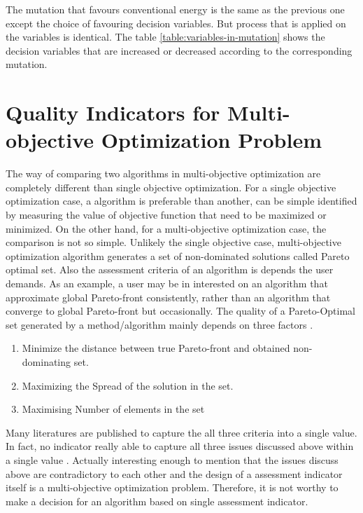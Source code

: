 \documentclass{article}
\begin{document}
The mutation that favours conventional energy is the same as the previous one except the choice of favouring decision variables. 
But process that is applied on the variables is identical.
The table \ref{table:variables-in-mutation} shows the decision variables that are increased or decreased according to the corresponding mutation.

\section{Quality Indicators for Multi-objective Optimization Problem}
\label{sec:Quality Indicators for Multi-objective Optimization Problem}
The way of comparing two algorithms in multi-objective optimization are completely different than single objective optimization. 
For a single objective optimization case, a algorithm is preferable than another, can be simple identified by measuring the value of objective function that need to be maximized or minimized. 
On the other hand, for a multi-objective optimization case, the comparison is not so simple. 
Unlikely the single objective case, multi-objective optimization algorithm generates a set of non-dominated solutions called Pareto optimal set. 
Also the assessment criteria of an algorithm is depends the user demands.
As an example, a user may be in interested on an algorithm that approximate global Pareto-front consistently, rather than an algorithm that converge to global Pareto-front but occasionally.
The quality of a Pareto-Optimal set generated by a method/algorithm mainly depends on three factors \cite{sarker_assessment_2002}.
\begin{enumerate}
\item Minimize the distance between true Pareto-front and obtained non-dominating set.
\item Maximizing the Spread of the solution in the set.
\item Maximising Number of elements in the set
\end{enumerate}

Many literatures are published to capture the all three criteria into a single value. 
In fact, no indicator really able to capture all three issues discussed above within a single value \cite{sarker_assessment_2002}.
Actually interesting enough to mention that the issues discuss above are contradictory to each other and the design of a assessment indicator itself is a multi-objective optimization problem. 
Therefore, it is not worthy to make a decision for an algorithm based on single assessment indicator. 
      
\end{document}
